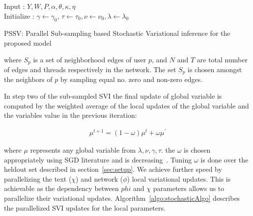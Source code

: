\documentclass{sig-alternate}
\begin{document}
\IncMargin{1em}
\begin{algorithm}[t]
\small
\SetAlgoLined
Input : $Y,W,P,\alpha,\theta,\kappa,\eta$\\
Initialize : $\gamma\leftarrow \gamma_0$,
$\tau\leftarrow \tau_0, \nu\leftarrow \nu_0, \lambda\leftarrow \lambda_0$\\
\label{algo:stochasticAlgo}
\caption{PSSV: Parallel Sub-sampling based Stochastic Variational inference for
the proposed model}
\end{algorithm}




where $S_p$ is a set of neighborhood edges of user $p$, and $N$ and $T$ are
total number of edges and threads respectively in the network. The set $S_p$ is
chosen amongst the neighbors of $p$ by sampling equal no. zero and non-zero
edges. 

In step two of the sub-sampled SVI the final update of global variable is
computed by the weighted average of the local updates of the global variable and
the variables value in the previous iteration:

\begin{align}
\mu^{t+1} = (1-\omega)\mu^{t} + \omega\mu^{'} 
\label{eqn:globalUpStoc}
\end{align} 

where $\mu$ represents any global variable from $\lambda, \nu, \gamma, \tau$.
the $\omega$ is chosen appropriately using SGD literature and is
decreasing~\cite{conf/nips/GopalanMGFB12}. Tuning $\omega$ is done over
the heldout set described in section~\ref{sec:setup}.
We achieve further speed by parallelizing the text ($\chi$) and network
($\phi$) local variational updates. This is achievable  as the
dependency between $phi$ and $\chi$ parameters allows us to parallelize their
variational updates. Algorithm~\ref{algo:stochasticAlgo} describes the
parallelized SVI updates for the local parameters.
\end{document}
